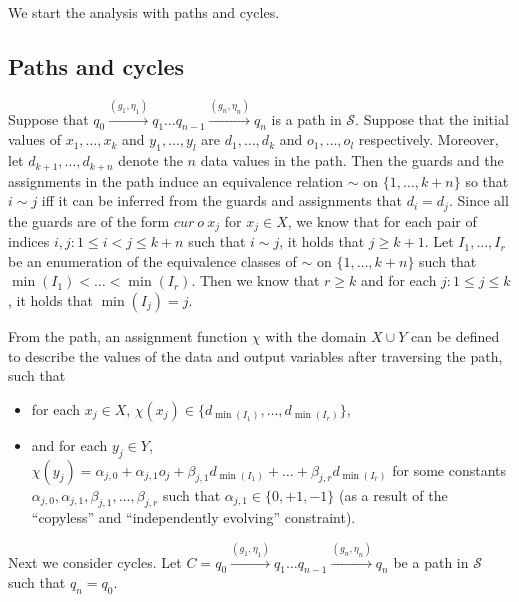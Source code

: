 \documentclass[runningheads,a4paper]{llncs}
\def\Ss{{\mathcal{S} }}
\newcommand{\zhilin}[1]{\color{cyan} {ZL: #1 :LZ} \color{black}}
\begin{document}

We start the analysis with paths and cycles.

\subsection{Paths and cycles}

Suppose that $q_0 \xrightarrow{(g_1,\eta_1)} q_1 \dots q_{n-1} \xrightarrow{(g_n, \eta_n)} q_n$ is a path in $\Ss$. Suppose that the initial values of $x_1,\dots, x_k$ and $y_1,\dots, y_l$ are $d_1,\dots, d_k$ and $o_1,\dots,o_l$ respectively. Moreover, let $d_{k+1},\dots,d_{k+n}$ denote the $n$ data values in the path. Then the guards and the assignments in the path induce an equivalence relation $\sim$ on $\{1,\dots, k+n\}$ so that  $i \sim j$ iff it can be inferred from the guards and assignments that $d_i = d_j$. Since all the guards are of the form $cur\ o\ x_j$ for $x_j \in X$, we know that for each pair of indices $i,j: 1 \le i < j \le k+n$ such that $i \sim j$, it holds that $j \ge k+1$. Let $I_1,\dots, I_r$ be an enumeration of the equivalence classes of $\sim$ on $\{1,\dots,k+n\}$ such that $\min(I_1) < \dots < \min(I_r)$. Then we know that $r \ge k$ and for each $j: 1 \le j \le k$, it holds that $\min(I_j)=j$.

From the path, an assignment function $\chi$ with the domain $X \cup Y$ can be defined to describe the values of the data and output variables after traversing the path, such that 
\begin{itemize}
\item for each $x_j \in X$, $\chi(x_j) \in \{d_{\min(I_1)}, \dots, d_{\min(I_r)}\}$, 
\item and for each $y_j \in Y$, $\chi(y_j) = \alpha_{j,0} + \alpha_{j,1} o_j + \beta_{j,1} d_{\min(I_1)} + \dots + \beta_{j,r} d_{\min(I_r)}$ for some constants $\alpha_{j,0},\alpha_{j,1}, \beta_{j,1},\dots,\beta_{j,r}$ such that $\alpha_{j,1} \in \{0,+1,-1\}$ (as a result of the ``copyless'' and ``independently evolving'' constraint).
\end{itemize}

Next we consider cycles. Let $C = q_0 \xrightarrow{(g_1,\eta_1)} q_1 \dots q_{n-1} \xrightarrow{(g_n, \eta_n)} q_n$ be a path in $\Ss$ such that $q_n = q_0$.
\end{document}
